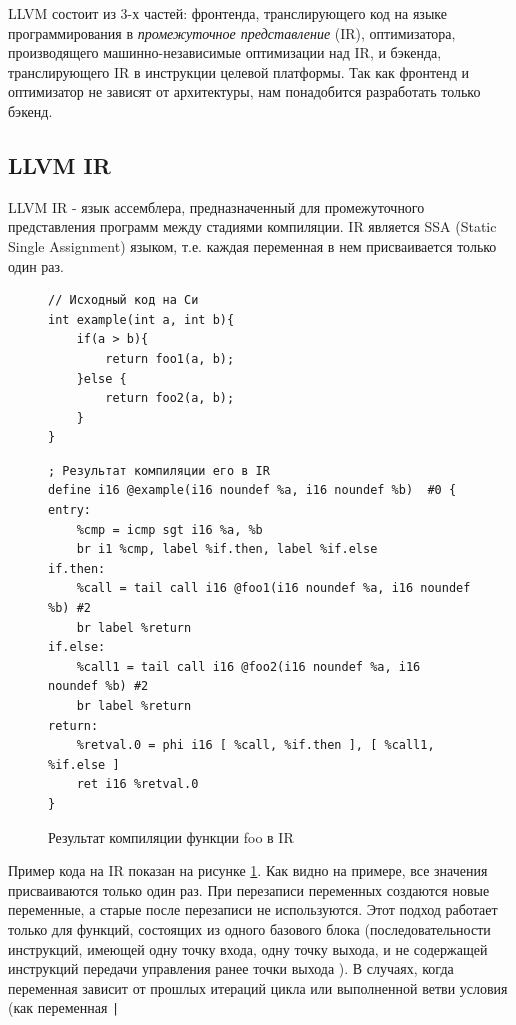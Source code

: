 \documentclass[a4paper,14pt]{extarticle}
\begin{document}
LLVM состоит из 3-х частей: фронтенда, транслирующего код на языке программирования в \emph{промежуточное представление} (IR)\cite{llvm:langref}, оптимизатора, производящего машинно-независимые оптимизации над IR, и бэкенда, транслирующего IR в инструкции целевой платформы. Так как фронтенд и оптимизатор не зависят от архитектуры, нам %
понадобится разработать только бэкенд.

\subsection{LLVM IR}
LLVM IR - язык ассемблера, предназначенный для промежуточного представления программ между стадиями компиляции. IR является SSA (Static Single Assignment) языком, т.е. каждая переменная в нем присваивается только один раз. 
\begin{figure}[h!]
	\begin{verbatim}
// Исходный код на Си
int example(int a, int b){
	if(a > b){
		return foo1(a, b);
	}else {
		return foo2(a, b);
	}
}
	\end{verbatim}
	
	\begin{verbatim}
; Результат компиляции его в IR
define i16 @example(i16 noundef %a, i16 noundef %b)  #0 {
entry:
	%cmp = icmp sgt i16 %a, %b
	br i1 %cmp, label %if.then, label %if.else
if.then: 
	%call = tail call i16 @foo1(i16 noundef %a, i16 noundef %b) #2
	br label %return
if.else: 
	%call1 = tail call i16 @foo2(i16 noundef %a, i16 noundef %b) #2
	br label %return
return: 
	%retval.0 = phi i16 [ %call, %if.then ], [ %call1, %if.else ]
	ret i16 %retval.0
}
	\end{verbatim}
	\caption{Результат компиляции функции foo в IR}
	\label{ir_example}
\end{figure}

Пример кода на IR показан на рисунке \ref{ir_example}. Как видно на примере, все значения присваиваются только один раз. При перезаписи переменных создаются новые переменные, а старые после перезаписи не используются. Этот подход работает только для функций, состоящих из одного базового блока (последовательности инструкций, имеющей одну точку входа, одну точку выхода, и не содержащей инструкций передачи управления ранее точки выхода \cite{contraol_flow_analysis}). В случаях, когда переменная зависит от прошлых итераций цикла или выполненной ветви условия  (как переменная \texttt|%
\end{document}
